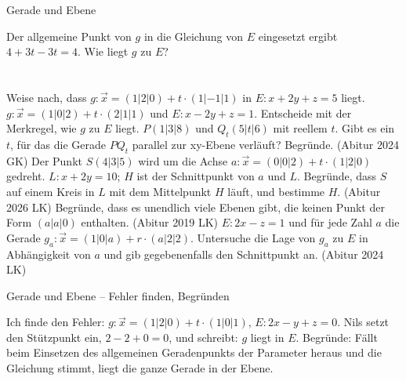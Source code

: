 \setcounter{aufgabe}{13}

\begin{aufgabe}{Gerade und Ebene}
\begin{teile}
\teil Der allgemeine Punkt von $g$ in die Gleichung von $E$ eingesetzt ergibt $4 + 3t - 3t = 4$. Wie liegt $g$ zu $E$? \\  \\  \\ 
\teil Weise nach, dass $g: \vec{x} = (1 | 2 | 0) + t \cdot (1 | -1 | 1)$ in $E: x + 2y + z = 5$ liegt.
\teil $g: \vec{x} = (1 | 0 | 2) + t \cdot (2 | 1 | 1)$ und $E: x - 2y + z = 1$. Entscheide mit der Merkregel, wie $g$ zu $E$ liegt.
\teil $P(1 | 3 | 8)$ und $Q_t(5 | t | 6)$ mit reellem $t$. Gibt es ein $t$, für das die Gerade $PQ_t$ parallel zur xy-Ebene verläuft? Begründe. \hfill (Abitur 2024 GK)
\teil Der Punkt $S(4 | 3 | 5)$ wird um die Achse $a: \vec{x} = (0 | 0 | 2) + t \cdot (1 | 2 | 0)$ gedreht. $L: x + 2y = 10$; $H$ ist der Schnittpunkt von $a$ und $L$. Begründe, dass $S$ auf einem Kreis in $L$ mit dem Mittelpunkt $H$ läuft, und bestimme $H$. \hfill (Abitur 2026 LK)
\teil Begründe, dass es unendlich viele Ebenen gibt, die keinen Punkt der Form $(a | a | 0)$ enthalten. \hfill (Abitur 2019 LK)
\teil $E: 2x - z = 1$ und für jede Zahl $a$ die Gerade $g_a: \vec{x} = (1 | 0 | a) + r \cdot (a | 2 | 2)$. Untersuche die Lage von $g_a$ zu $E$ in Abhängigkeit von $a$ und gib gegebenenfalls den Schnittpunkt an. \hfill (Abitur 2024 LK)
\end{teile}
\end{aufgabe}

\begin{aufgabe}{Gerade und Ebene – Fehler finden, Begründen}
\begin{teile}
\teil Ich finde den Fehler: $g: \vec{x} = (1 | 2 | 0) + t \cdot (1 | 0 | 1)$, $E: 2x - y + z = 0$. Nils setzt den Stützpunkt ein, $2 - 2 + 0 = 0$, und schreibt: $g$ liegt in $E$.
\teil Begründe: Fällt beim Einsetzen des allgemeinen Geradenpunkts der Parameter heraus und die Gleichung stimmt, liegt die ganze Gerade in der Ebene.
\end{teile}
\end{aufgabe}
